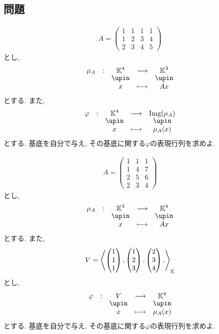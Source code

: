 \subsection{問題}


\begin{quiz}
  \begin{align*}
    A=
    \begin{pmatrix}
      1&1&1&1\\
      1&2&3&4\\
      2&3&4&5
    \end{pmatrix}
  \end{align*}
  とし,
  \begin{align*}
    \shazo{\mu_A}{\KK^4}{\KK^3}
    {x}{Ax}
  \end{align*}
  とする.
  また,
  \begin{align*}
    \shazo{\varphi}{\KK^4}{\Img(\mu_A)}
    {x}{\mu_A(x)}
  \end{align*}
  とする.
  基底を自分で与え,
  その基底に関する$\varphi$の表現行列を求めよ.
\end{quiz}

\begin{quiz}
  \begin{align*}
    A=
    \begin{pmatrix}
      1&1&1\\
      1&4&7\\
      2&5&6\\
      2&3&4
    \end{pmatrix}
  \end{align*}
  とし,
  \begin{align*}
    \shazo{\mu_A}{\KK^3}{\KK^4}
    {x}{Ax}
  \end{align*}
  とする.
  また,
  \begin{align*}
    V=\Braket{
      \begin{pmatrix}1\\1\\1\end{pmatrix},
      \begin{pmatrix}1\\2\\3\end{pmatrix},
      \begin{pmatrix}2\\3\\4\end{pmatrix},
    }_{\mathbb{K}}
  \end{align*}
  とし,
  \begin{align*}
    \shazo{\varphi}{V}{\KK^4}
    {x}{\mu_A(x)}
  \end{align*}
  とする.
  基底を自分で与え,
  その基底に関する$\varphi$の表現行列を求めよ.
\end{quiz}


